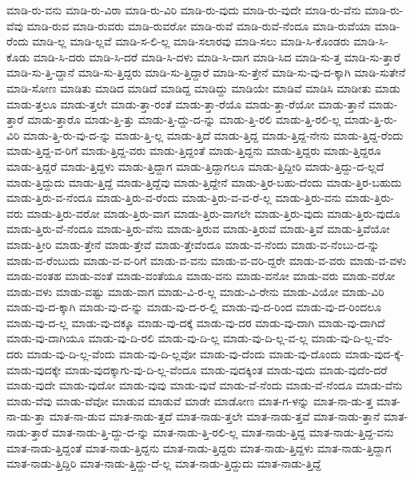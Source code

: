 {ಮಾಡಿ-ರು-ವನು
ಮಾಡಿ-ರು-ವಿರಾ
ಮಾಡಿ-ರು-ವಿರಿ
ಮಾಡಿ-ರು-ವುದು
ಮಾಡಿ-ರು-ವುದೇ
ಮಾಡಿ-ರು-ವೆನು
ಮಾಡಿ-ರು-ವೆವು
ಮಾಡಿ-ರುವ
ಮಾಡಿ-ರುವರು
ಮಾಡಿ-ರುವರೋ
ಮಾಡಿ-ರುವೆ
ಮಾಡಿ-ರುವೆ-ನೆಂದೂ
ಮಾಡಿ-ರುವೆಯಾ
ಮಾಡಿ-ರೆಂದು
ಮಾಡಿ-ಲ್ಲ
ಮಾಡಿ-ಲ್ಲವೆ
ಮಾಡಿ-ಸ-ಲಿ-ಲ್ಲ
ಮಾಡಿ-ಸಲಾರವು
ಮಾಡಿ-ಸಲು
ಮಾಡಿ-ಸಿ-ಕೊಂಡರು
ಮಾಡಿ-ಸಿ-ಕೊಡು
ಮಾಡಿ-ಸಿ-ದರು
ಮಾಡಿ-ಸಿ-ದರೆ
ಮಾಡಿ-ಸಿ-ದಳು
ಮಾಡಿ-ಸಿ-ದಾಗ
ಮಾಡಿ-ಸಿದ
ಮಾಡಿ-ಸು-ತ್ತ
ಮಾಡಿ-ಸು-ತ್ತಾರೆ
ಮಾಡಿ-ಸು-ತ್ತಿ-ದ್ದಾನೆ
ಮಾಡಿ-ಸು-ತ್ತಿದ್ದರು
ಮಾಡಿ-ಸು-ತ್ತಿದ್ದಾರೆ
ಮಾಡಿ-ಸು-ತ್ತೇನೆ
ಮಾಡಿ-ಸು-ವು-ದ-ಕ್ಕಾಗಿ
ಮಾಡಿ-ಸುತೇನೆ
ಮಾಡಿ-ಸೋಣ
ಮಾಡಿತು
ಮಾಡಿದ
ಮಾಡಿದೆ
ಮಾಡಿದ್ದ
ಮಾಡಿದ್ದು
ಮಾಡಿಯೇ
ಮಾಡಿವೆ
ಮಾಡಿಸಿ
ಮಾಡೀತು
ಮಾಡು
ಮಾಡು-ತ್ತಲೂ
ಮಾಡು-ತ್ತಲೇ
ಮಾಡು-ತ್ತಾ-ರಂತೆ
ಮಾಡು-ತ್ತಾ-ರೆಯೊ
ಮಾಡು-ತ್ತಾ-ರೆಯೋ
ಮಾಡು-ತ್ತಾನೆ
ಮಾಡು-ತ್ತಾರೆ
ಮಾಡು-ತ್ತಾರೊ
ಮಾಡು-ತ್ತಿ-ತ್ತು
ಮಾಡು-ತ್ತಿ-ದ್ದು-ದ-ನ್ನು
ಮಾಡು-ತ್ತಿ-ರಲಿ
ಮಾಡು-ತ್ತಿ-ರಲಿ-ಲ್ಲ
ಮಾಡು-ತ್ತಿ-ರು-ವಿರಿ
ಮಾಡು-ತ್ತಿ-ರು-ವು-ದ-ನ್ನು
ಮಾಡು-ತ್ತಿ-ಲ್ಲ
ಮಾಡು-ತ್ತಿದೆ
ಮಾಡು-ತ್ತಿದ್ದ
ಮಾಡು-ತ್ತಿದ್ದ-ನೇನು
ಮಾಡು-ತ್ತಿದ್ದ-ರೆಂದು
ಮಾಡು-ತ್ತಿದ್ದ-ವ-ರಿಗೆ
ಮಾಡು-ತ್ತಿದ್ದ-ವರು
ಮಾಡು-ತ್ತಿದ್ದಂತೆ
ಮಾಡು-ತ್ತಿದ್ದನು
ಮಾಡು-ತ್ತಿದ್ದರು
ಮಾಡು-ತ್ತಿದ್ದರೂ
ಮಾಡು-ತ್ತಿದ್ದರೆ
ಮಾಡು-ತ್ತಿದ್ದಳು
ಮಾಡು-ತ್ತಿದ್ದಾಗ
ಮಾಡು-ತ್ತಿದ್ದಾಗಲೂ
ಮಾಡು-ತ್ತಿದ್ದೀರಿ
ಮಾಡು-ತ್ತಿದ್ದು-ದ-ಲ್ಲದೆ
ಮಾಡು-ತ್ತಿದ್ದುದು
ಮಾಡು-ತ್ತಿದ್ದೆ
ಮಾಡು-ತ್ತಿದ್ದೆವು
ಮಾಡು-ತ್ತಿದ್ದೇನೆ
ಮಾಡು-ತ್ತಿರ-ಬಹು-ದೆಂದು
ಮಾಡು-ತ್ತಿರ-ಬಹುದು
ಮಾಡು-ತ್ತಿರು-ವ-ನೆಂದೂ
ಮಾಡು-ತ್ತಿರು-ವ-ರೆಂದು
ಮಾಡು-ತ್ತಿರು-ವ-ವ-ರೆ-ಲ್ಲ
ಮಾಡು-ತ್ತಿರು-ವನು
ಮಾಡು-ತ್ತಿರು-ವರು
ಮಾಡು-ತ್ತಿರು-ವರೋ
ಮಾಡು-ತ್ತಿರು-ವಾಗ
ಮಾಡು-ತ್ತಿರು-ವಾಗಲೇ
ಮಾಡು-ತ್ತಿರು-ವುದು
ಮಾಡು-ತ್ತಿರು-ವುದೊ
ಮಾಡು-ತ್ತಿರು-ವೆ-ನೆಂದೂ
ಮಾಡು-ತ್ತಿರು-ವೆನು
ಮಾಡು-ತ್ತಿರುವ
ಮಾಡು-ತ್ತಿರುವೆ
ಮಾಡು-ತ್ತಿವೆ
ಮಾಡು-ತ್ತಿವೆಯೋ
ಮಾಡು-ತ್ತೀರಿ
ಮಾಡು-ತ್ತೇನೆ
ಮಾಡು-ತ್ತೇವೆ
ಮಾಡು-ತ್ತೇವೆಂದೂ
ಮಾಡು-ವ-ನೆಂದು
ಮಾಡು-ವ-ನೆಂಬು-ದ-ನ್ನು
ಮಾಡು-ವ-ರೆಂಬುದು
ಮಾಡು-ವ-ವ-ರಿಗೆ
ಮಾಡು-ವ-ವನು
ಮಾಡು-ವ-ವರಿ-ದ್ದರೇ
ಮಾಡು-ವ-ವರು
ಮಾಡು-ವ-ವಳು
ಮಾಡು-ವಂತಹ
ಮಾಡು-ವಂತೆ
ಮಾಡು-ವಂತೆಯೂ
ಮಾಡು-ವನು
ಮಾಡು-ವನೋ
ಮಾಡು-ವರು
ಮಾಡು-ವರೋ
ಮಾಡು-ವಳು
ಮಾಡು-ವಷ್ಟು
ಮಾಡು-ವಾಗ
ಮಾಡು-ವಿ-ರ-ಲ್ಲ
ಮಾಡು-ವಿ-ರೇನು
ಮಾಡು-ವಿಯೋ
ಮಾಡು-ವಿರಿ
ಮಾಡು-ವು-ದ-ಕ್ಕಾಗಿ
ಮಾಡು-ವು-ದ-ನ್ನು
ಮಾಡು-ವು-ದ-ರ-ಲ್ಲಿ
ಮಾಡು-ವು-ದ-ರಿಂದ
ಮಾಡು-ವು-ದ-ರಿಂದಲೂ
ಮಾಡು-ವು-ದ-ಲ್ಲ
ಮಾಡು-ವು-ದಕ್ಕೂ
ಮಾಡು-ವು-ದಕ್ಕೆ
ಮಾಡು-ವು-ದರ
ಮಾಡು-ವು-ದಾಗಿ
ಮಾಡು-ವು-ದಾಗಿದೆ
ಮಾಡು-ವು-ದಾಗಿಯೂ
ಮಾಡು-ವು-ದಿ-ರಲಿ
ಮಾಡು-ವು-ದಿ-ಲ್ಲ
ಮಾಡು-ವು-ದಿ-ಲ್ಲ-ವ-ಲ್ಲ
ಮಾಡು-ವು-ದಿ-ಲ್ಲ-ವೆಂ-ದರು
ಮಾಡು-ವು-ದಿ-ಲ್ಲ-ವೆಂದು
ಮಾಡು-ವು-ದಿ-ಲ್ಲವೋ
ಮಾಡು-ವು-ದೆಂದು
ಮಾಡು-ವು-ದೊಂದು
ಮಾಡು-ವುದ-ಕ್ಕೆ-ಮಾಡು-ವುದಕ್ಕೇ
ಮಾಡು-ವುದಕ್ಕಾಗು-ವು-ದಿ-ಲ್ಲ-ವೆಂದೂ
ಮಾಡು-ವುದಕ್ಕಿಂತ
ಮಾಡು-ವುದು
ಮಾಡು-ವುದೆಂ-ದರೆ
ಮಾಡು-ವುದೇ
ಮಾಡು-ವುದೋ
ಮಾಡು-ವುವು
ಮಾಡು-ವುವೆ
ಮಾಡು-ವೆ-ನೆಂದು
ಮಾಡು-ವೆ-ನೆಂದೂ
ಮಾಡು-ವೆನು
ಮಾಡು-ವೆವು
ಮಾಡು-ವೆವೋ
ಮಾಡುವ
ಮಾಡುವೆ
ಮಾಡೇ
ಮಾಡೋಣ
ಮಾತ-ಗ-ಳನ್ನು
ಮಾತ-ನಾ-ಡು-ತ್ತ
ಮಾತ-ನಾ-ಡು-ತ್ತಾ
ಮಾತ-ನಾ-ಡುವ
ಮಾತ-ನಾಡು-ತ್ತದೆ
ಮಾತ-ನಾಡು-ತ್ತಲೇ
ಮಾತ-ನಾಡು-ತ್ತವೆ
ಮಾತ-ನಾಡು-ತ್ತಾನೆ
ಮಾತ-ನಾಡು-ತ್ತಾರೆ
ಮಾತ-ನಾಡು-ತ್ತಿ-ದ್ದು-ದ-ನ್ನು
ಮಾತ-ನಾಡು-ತ್ತಿ-ರಲಿ-ಲ್ಲ
ಮಾತ-ನಾಡು-ತ್ತಿದ್ದ
ಮಾತ-ನಾಡು-ತ್ತಿದ್ದ-ವನು
ಮಾತ-ನಾಡು-ತ್ತಿದ್ದಂತೆ
ಮಾತ-ನಾಡು-ತ್ತಿದ್ದನು
ಮಾತ-ನಾಡು-ತ್ತಿದ್ದರು
ಮಾತ-ನಾಡು-ತ್ತಿದ್ದಳು
ಮಾತ-ನಾಡು-ತ್ತಿದ್ದಾಗ
ಮಾತ-ನಾಡು-ತ್ತಿದ್ದಿರಿ
ಮಾತ-ನಾಡು-ತ್ತಿದ್ದು-ದೆ-ಲ್ಲ
ಮಾತ-ನಾಡು-ತ್ತಿದ್ದುದು
ಮಾತ-ನಾಡು-ತ್ತಿದ್ದೆ
}
